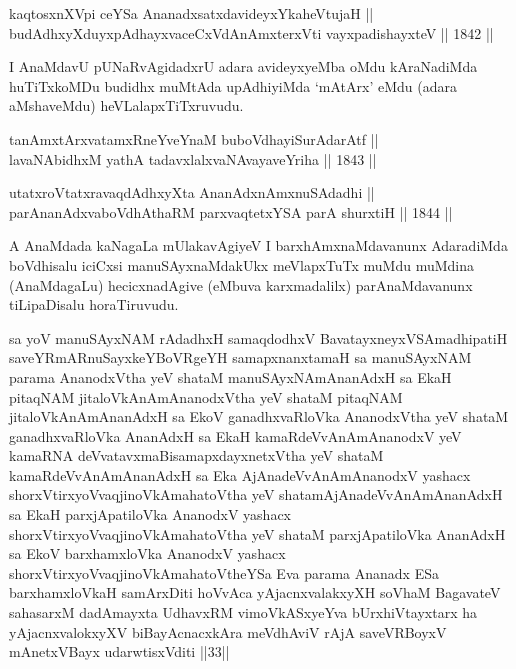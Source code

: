 
\begin{shl}
kaqtosxnXV\s pi ceYSa AnanadxsatxdavideyxYkaheVtujaH || \\
budAdhxyXduyxpAdhayxvaceCxVdAnAmxterxVti vayxpadishayxteV \hfill || 1842 ||  
\end{shl}

\begin{artha}
I AnaMdavU pUNaRvAgidadxrU adara avideyxyeMba oMdu kAraNadiMda
huTiTxkoMDu budidhx muMtAda upAdhiyiMda `mAtArx' eMdu (adara
aMshaveMdu) heVLalapxTiTxruvudu.
\end{artha}


\begin{shl}
tanAmxtArxvatamxRneYveYnaM buboVdhayiSurAdarAtf || \\
lavaNAbidhxM yathA tadavxlalxvaNAvayaveYriha \hfill || 1843 ||  
\end{shl}

\begin{shl}
utatxroVtatxravaqdAdhxyX\s ta AnanAdxnAmxnuSAdadhi || \\
parAnanAdxvaboVdhAthaRM parxvaqtetxYSA parA shurxtiH \hfill || 1844 ||  
\end{shl}


\begin{artha}
A AnaMdada kaNagaLa mUlakavAgiyeV I barxhAmxnaMdavanunx AdaradiMda
boVdhisalu iciCxsi manuSAyxnaMdakUkx meVlapxTuTx muMdu muMdina
(AnaMdagaLu) hecicxnadAgive (eMbuva karxmadalilx) parAnaMdavanunx
tiLipaDisalu horaTiruvudu.
\end{artha}


\begin{shl}
sa yoV manuSAyxNAM rAdadhxH samaqdodhxV BavatayxneyxVSAmadhipatiH saveYRmARnuSayxkeYBoVRgeYH samapxnanxtamaH sa manuSAyxNAM parama AnanodxV\s tha yeV shataM manuSAyxNAmAnanAdxH sa EkaH pitaqNAM jitaloVkAnAmAnanodxV\s tha yeV shataM pitaqNAM jitaloVkAnAmAnanAdxH sa EkoV ganadhxvaRloVka AnanodxV\s tha yeV shataM ganadhxvaRloVka AnanAdxH sa EkaH kamaRdeVvAnAmAnanodxV yeV kamaRNA deVvatavxmaBisamapxdayxnetxV\s tha yeV shataM kamaRdeVvAnAmAnanAdxH sa Eka AjAnadeVvAnAmAnanodxV yashacx shorxVtirxyoV\s vaqjinoV\s kAmahatoV\s tha yeV shatamAjAnadeVvAnAmAnanAdxH sa EkaH parxjApatiloVka AnanodxV yashacx shorxVtirxyoV\s vaqjinoV\s kAmahatoV\s tha yeV shataM parxjApatiloVka AnanAdxH sa EkoV barxhamxloVka AnanodxV yashacx shorxVtirxyoV\s vaqjinoV\s kAmahatoV\s theYSa Eva parama Ananadx ESa barxhamxloVkaH samArxDiti hoVvAca yAjacnxvalakxyXH soVhaM BagavateV sahasarxM dadAmayxta UdhavxRM vimoVkASxyeYva bUrxhiVtayxtarx ha yAjacnxvalokxyXV biBayAcnacxkAra meVdhAviV rAjA saveVRBoyxV mAnetxVBayx udarwtisxVditi ||33||
\end{shl}

